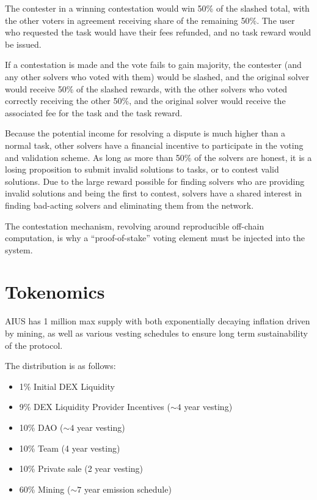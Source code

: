 \documentclass{article}
\begin{document}
The contester in a winning contestation would win 50\% of the slashed total, with the other voters in agreement receiving share of the remaining 50\%. The user who requested the task would have their fees refunded, and no task reward would be issued.

If a contestation is made and the vote fails to gain majority, the contester (and any other solvers who voted with them) would be slashed, and the original solver would receive 50\% of the slashed rewards, with the other solvers who voted correctly receiving the other 50\%, and the original solver would receive the associated fee for the task and the task reward.

Because the potential income for resolving a dispute is much higher than a normal task, other solvers have a financial incentive to participate in the voting and validation scheme. As long as more than 50\% of the solvers are honest, it is a losing proposition to submit invalid solutions to tasks, or to contest valid solutions. Due to the large reward possible for finding solvers who are providing invalid solutions and being the first to contest, solvers have a shared interest in finding bad-acting solvers and eliminating them from the network.

The contestation mechanism, revolving around reproducible off-chain computation, is why a ``proof-of-stake'' voting element must be injected into the system. 

\newpage

\section{Tokenomics}\label{tokenomics}

AIUS has 1 million max supply with both exponentially decaying inflation driven by mining, as well as various vesting schedules to ensure long term sustainability of the protocol.

The distribution is as follows:

\begin{itemize}
    \item 1\% Initial DEX Liquidity
    \item 9\% DEX Liquidity Provider Incentives ($\sim4$ year vesting)
    \item 10\% DAO ($\sim4$ year vesting)
    \item 10\% Team (4 year vesting)
    \item 10\% Private sale (2 year vesting)
    \item 60\% Mining ($\sim7$ year emission schedule)
\end{itemize}
\end{document}
